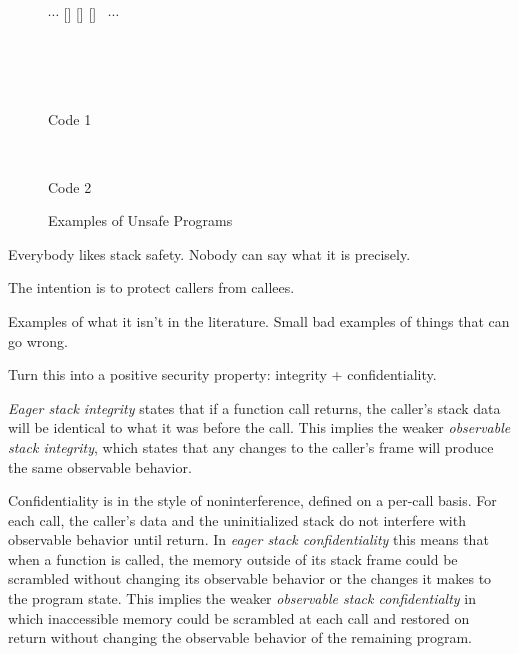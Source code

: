 \documentclass[acmsmall,review,anonymous]{acmart}\settopmatter{printfolios=true,printccs=false,printacmref=false}
\begin{document}
\begin{figure}
  \begin{minipage}{\textwidth}
  \begin{center}
$\cdots$
%
[{}]%
[{}]%
[{}]%
%
~$\cdots$
  \end{center}
  \end{minipage}\\
~\\
~\\
  \begin{minipage}{0.45\textwidth}
    \begin{center}
      Code 1
    \end{center}
  \end{minipage}~
  \begin{minipage}{0.45\textwidth}
    \begin{center}
      Code 2
    \end{center}
  \end{minipage}
  \caption{Examples of Unsafe Programs}
  \label{fig:stackunsafety}
\end{figure}


Everybody likes stack safety. Nobody can say what it is precisely.

The intention is to protect callers from callees.

Examples of what it isn't in the literature.
Small bad examples of things that can go wrong.

Turn this into a positive security property: integrity + confidentiality.

    {\it Eager stack integrity} states that if a function call returns, the caller's stack data
    will be identical to what it was before the call. This implies the weaker {\it observable
    stack integrity}, which states that any changes to the caller's frame will produce the same
    observable behavior.

    Confidentiality is in the style of noninterference, defined on a per-call basis. For each call,
    the caller's data and the uninitialized stack do not interfere with observable behavior until return.
    In {\it eager stack confidentiality} this means that when a function is called, the memory outside of
    its stack frame could be scrambled without changing its observable behavior or the changes it makes
    to the program state. This implies the weaker {\it observable stack confidentialty} in which
    inaccessible memory could be scrambled at each call and restored on return without changing the
    observable behavior of the remaining program.
\end{document}

